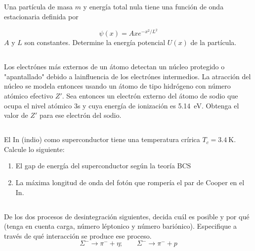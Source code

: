 \documentclass[12pt]{article}
\begin{document}
    \subsection{}
    Una partícula de masa $m$ y energía total nula tiene una función de onda estacionaria
    definida por

    $$\psi(x)=Axe^{-x^2/L^2}$$
    $A$ y $L$ son constantes. Determine la energía potencial $U(x)$ de la partícula.


    \subsection{}
    Los electrónes más externos de un átomo detectan un núcleo protegido o "apantallado"
    debido a lainfluencia de los electrónes intermedios. La atracción del núcleo se modela
    entonces usando un átomo de tipo hidrógeno con número atómico efectivo $Z'$. Sea entonces
    un electrón externo del átomo de sodio que ocupa el nivel atómico 3s y cuya energía
    de ionización es \SI{5.14}{\electronvolt}. Obtenga el valor de $Z'$ para ese electrón del sodio.

    \subsection{}
    El In (indio) como superconductor tiene una temperatura crírica ${T_c=\SI{3.4}{\kelvin}}$. Calcule
    lo siguiente:
    \begin{enumerate}[label=\alph*)]
        \item El gap de energía del superconductor según la teoría BCS
        \item La máxima longitud de onda del fotón que rompería el par de Cooper en el In.
    \end{enumerate}


    \subsection{}
    De los dos procesos de desintegración siguientes, decida cuál es posible y por qué
    (tenga en cuenta carga, número léptonico y número bariónico). Especifique a través
    de qué interacción se produce ese proceso.
    $$\Sigma^{-} \rightarrow \pi^{-} + \eta;   \quad \quad \Sigma^{-} \rightarrow \pi^{-} + p$$
\end{document}
